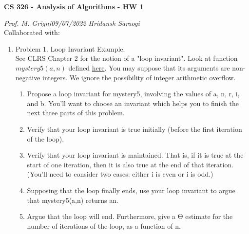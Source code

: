 \documentclass[11pt]{article}
\begin{document}
\begin{center}
    \textbf{CS 326 - Analysis of Algorithms - HW 1}\\
\end{center}


\begin{flushleft}
    \textit{Prof. M. Grigni\hfill09/07/2022 \hfill Hridansh Saraogi} \\
    \vspace{0.15cm}
    \small {Collaborated with: }
\end{flushleft}


\begin{enumerate}

\item Problem 1. Loop Invariant Example. \\
See CLRS Chapter 2 for the notion of a "loop invariant". Look at function $mystery5(a,n)$ defined \href{https://cs.emory.edu/~mic/demos/mystery5.html}{here}. You may suppose that its arguments are non-negative integers. We ignore the possibility of integer arithmetic overflow.
    \begin{enumerate}
        \item Propose a loop invariant for mystery5, involving the values of a, n, r, i, and b. You'll want to choose an invariant which helps you to finish the next three parts of this problem. 
        
        \item Verify that your loop invariant is true initially (before the first iteration of the loop).

        \item Verify that your loop invariant is maintained. That is, if it is true at the start of one iteration, then it is also true at the end of that iteration. (You'll need to consider two cases: either i is even or i is odd.)

        \item Supposing that the loop finally ends, use your loop invariant to argue that mystery5(a,n) returns an.

        \item Argue that the loop will end. Furthermore, give a Θ estimate for the number of iterations of the loop, as a function of n.
    \end{enumerate}


\end{enumerate}
\end{document}
